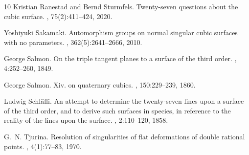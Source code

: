\documentclass[reqno]{amsart}
\numberwithin{equation}{section}
\begin{document}
\begin{thebibliography}{10}
Kristian Ranestad and Bernd Sturmfels.
\newblock Twenty-seven questions about the cubic surface.
, 75(2):411--424, 2020.

Yoshiyuki Sakamaki.
\newblock Automorphism groups on normal singular cubic surfaces with no parameters.
, 362(5):2641--2666, 2010.

George Salmon.
\newblock On the triple tangent planes to a surface of the third order.
, 4:252--260, 1849.

George Salmon.
\newblock Xiv. on quaternary cubics.
, 150:229--239, 1860.

Ludwig Schl{\"a}fli.
\newblock An attempt to determine the twenty-seven lines upon a surface of the third order, and to derive such surfaces in species, in reference to the reality of the lines upon the surface.
, 2:110--120, 1858.

G.~N. Tjurina.
\newblock Resolution of singularities of flat deformations of double rational points.
, 4(1):77--83, 1970.

\end{thebibliography}
\end{document}
